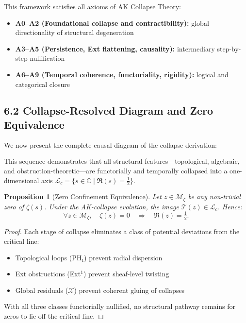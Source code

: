 \documentclass[11pt]{article}
\newtheorem{proposition}[theorem]{Proposition}
\newcommand{\Sha}{\mathcal{X}}
\begin{document}
This framework satisfies all axioms of AK Collapse Theory:

\begin{itemize}
    \item \textbf{A0–A2 (Foundational collapse and contractibility):} global directionality of structural degeneration
    \item \textbf{A3–A5 (Persistence, Ext flattening, causality):} intermediary step-by-step nullification
    \item \textbf{A6–A9 (Temporal coherence, functoriality, rigidity):} logical and categorical closure
\end{itemize}

\subsection{6.2 Collapse-Resolved Diagram and Zero Equivalence}

We now present the complete causal diagram of the collapse derivation:

\begin{center}
\end{center}


This sequence demonstrates that all structural features—topological, algebraic, and obstruction-theoretic—are functorially and temporally collapsed  
into a one-dimensional axis $\mathcal{L}_c = \{ s \in \mathbb{C} \mid \Re(s) = \tfrac{1}{2} \}$.

\begin{proposition}[Zero Confinement Equivalence]
Let $z \in \mathcal{M}_\zeta$ be any non-trivial zero of $\zeta(s)$.  
Under the AK-collapse evolution, the image $\mathcal{T}(z) \in \mathcal{L}_c$.  
Hence:
\[
\forall z \in \mathcal{M}_\zeta, \quad \zeta(z) = 0 \quad \Rightarrow \quad \Re(z) = \tfrac{1}{2}.
\]
\end{proposition}

\begin{proof}
Each stage of collapse eliminates a class of potential deviations from the critical line:
\begin{itemize}
    \item Topological loops (PH₁) prevent radial dispersion
    \item Ext obstructions (Ext$^1$) prevent sheaf-level twisting
    \item Global residuals ($\Sha$) prevent coherent gluing of collapses
\end{itemize}
With all three classes functorially nullified, no structural pathway remains for zeros to lie off the critical line.
\end{proof}
\end{document}
